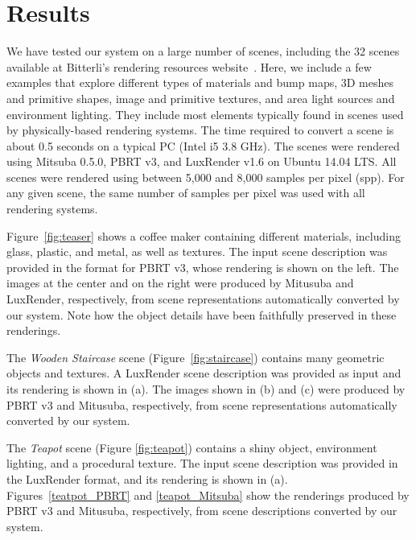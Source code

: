 \section{Results}
\label{sec:results}

We have tested our system on a large number of scenes, including the 32 scenes available
at Bitterli's rendering resources website~\cite{resources16}. 
Here, we include a few examples that explore different 
types of materials and bump maps, 3D meshes and primitive shapes, image and 
primitive textures, and area light sources and environment lighting. They include most elements typically found in scenes used by physically-based rendering systems.  The time required to convert a scene is about 0.5 seconds on a typical PC (Intel i5 3.8 GHz).
% 
%
The scenes were rendered using Mitsuba 0.5.0, PBRT v3, and LuxRender v1.6 on 
Ubuntu 14.04 LTS. All scenes were rendered using between 5,000 and 8,000 samples per pixel (spp). For any given scene,
the same number of samples per pixel was used with all rendering systems. 

Figure~\ref{fig:teaser} shows a coffee maker containing different materials, including glass, plastic, and metal, as well as textures. The input scene description was provided in the format for PBRT v3, whose rendering is shown on the left. The images at the center and on the right were produced by Mitusuba and LuxRender, respectively, from scene representations automatically converted by our system. 
Note how the object details have been faithfully preserved in these renderings.

The \textit{Wooden Staircase} scene (Figure~\ref{fig:staircase}) contains many geometric objects and textures. 
A LuxRender scene description was provided as input and its rendering is shown in (a). The images shown in (b) and (c) were produced 
by PBRT v3 and Mitusuba, respectively, from scene representations automatically converted by our system. 

The \textit{Teapot} scene (Figure \ref{fig:teapot}) contains a shiny object, environment lighting, and a procedural texture. The input scene description was provided in the LuxRender format, and its rendering is shown in (a). Figures~\ref{teatpot_PBRT} and \ref{teapot_Mitsuba} show the renderings produced by PBRT v3 and Mitusuba, respectively, from scene descriptions converted by our system.

